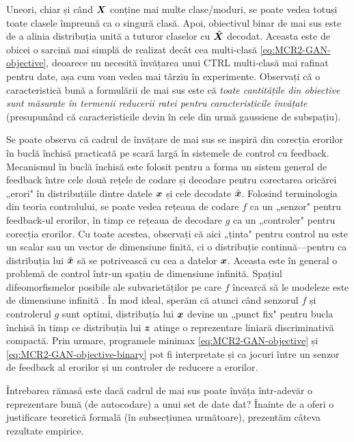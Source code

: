 \documentclass[../../book-main_ro.tex]{subfiles}
\begin{document}
Uneori, chiar și când $\bm{X}$ conține mai multe clase/moduri, se poate vedea totuși toate clasele împreună ca o singură clasă. Apoi, obiectivul binar de mai sus este de a alinia distribuția unită a tuturor claselor cu $\hat {\bm{X}}$ decodat. Aceasta este de obicei o sarcină mai simplă de realizat decât cea multi-clasă \eqref{eq:MCR2-GAN-objective}, deoarece nu necesită învățarea unui CTRL multi-clasă mai rafinat pentru date, așa cum vom vedea mai târziu în experimente. Observați că o caracteristică bună a formulării de mai sus este că {\em toate cantitățile din obiective sunt măsurate în termenii reducerii ratei pentru caracteristicile învățate} (presupunând că caracteristicile devin în cele din urmă gaussiene de subspațiu).

Se poate observa că cadrul de învățare de mai sus se inspiră din corecția erorilor în buclă închisă practicată pe scară largă în sistemele de control cu feedback. Mecanismul în buclă închisă este folosit pentru a forma un sistem general de feedback între cele două rețele de codare și decodare pentru corectarea oricărei „erori" în distribuțiile dintre datele $\bm{x}$ și cele decodate $\hat {\bm{x}}$. Folosind terminologia din teoria controlului, se poate vedea rețeaua de codare $f$ ca un „senzor" pentru feedback-ul erorilor, în timp ce rețeaua de decodare $g$ ca un „controler" pentru corecția erorilor. Cu toate acestea, observați că aici „ținta" pentru control nu este un scalar sau un vector de dimensiune finită, ci o distribuție continuă---pentru ca distribuția lui $\hat {\bm{x}}$ să se potrivească cu cea a datelor $\bm{x}$. Aceasta este în general o problemă de control într-un spațiu de dimensiune infinită. Spațiul difeomorfismelor posibile ale subvarietăților pe care $f$ încearcă să le modeleze este de dimensiune infinită \cite{Lee2002IntroductionTS}. În mod ideal, sperăm că atunci când senzorul $f$ și controlerul $g$ sunt optimi, distribuția lui $\bm{x}$ devine un „punct fix" pentru bucla închisă în timp ce distribuția lui $\bm{z}$ atinge o reprezentare liniară discriminativă compactă. Prin urmare, programele minimax \eqref{eq:MCR2-GAN-objective} și \eqref{eq:MCR2-GAN-objective-binary} pot fi interpretate și ca jocuri între un senzor de feedback al erorilor și un controler de reducere a erorilor.

Întrebarea rămasă este dacă cadrul de mai sus poate învăța într-adevăr o reprezentare bună (de autocodare) a unui set de date dat? Înainte de a oferi o justificare teoretică formală (în subsecțiunea următoare), prezentăm câteva rezultate empirice.
\end{document}
